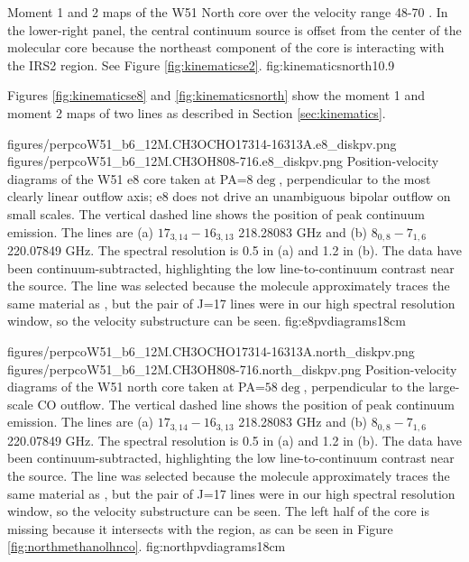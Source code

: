 \documentclass[twocolumn]{aastex61}
\begin{document}
{Moment 1 and 2 maps of the W51 North core over the velocity
range 48-70 \kms.  In the lower-right panel, the central
continuum source is offset from the center of the molecular core
because the northeast component of the core is interacting
with the IRS2 \hii region. See Figure \ref{fig:kinematicse2}.}
{fig:kinematicsnorth}{1}{0.9\textwidth}

Figures \ref{fig:kinematicse8} and \ref{fig:kinematicsnorth} show the moment 1
and moment 2 maps of two \methanol lines as described in Section
\ref{sec:kinematics}.

\FigureTwo
{figures/perpcoW51_b6_12M.CH3OCHO17314-16313A.e8_diskpv.png}
{figures/perpcoW51_b6_12M.CH3OH808-716.e8_diskpv.png}
{Position-velocity diagrams of the W51 e8 core taken at PA=$8\deg$,
perpendicular to the most clearly linear outflow axis; e8 does not drive an
unambiguous bipolar outflow on small scales.  The vertical dashed line shows the
position of peak continuum emission. The lines are (a) \methylformate
$17_{3,14}-16_{3,13}$ 218.28083 GHz and (b) \methanol $8_{0,8}-7_{1,6}$
220.07849 GHz.  The spectral resolution is 0.5 \kms in (a) and 1.2 \kms in (b).
The data have been continuum-subtracted, highlighting the low line-to-continuum
contrast near the source.  The \methylformate line was selected because the
molecule approximately traces the same material as \methanol, but the pair of
\methylformate J=17 lines were in our high spectral resolution window, so the
velocity substructure can be seen.
}
{fig:e8pvdiagrams}{1}{8cm}

\FigureTwo
{figures/perpcoW51_b6_12M.CH3OCHO17314-16313A.north_diskpv.png}
{figures/perpcoW51_b6_12M.CH3OH808-716.north_diskpv.png}
{Position-velocity diagrams of the W51 north core taken at PA=$58\deg$,
perpendicular to the large-scale CO outflow.  The vertical dashed line shows the
position of peak continuum emission. The lines are (a) \methylformate
$17_{3,14}-16_{3,13}$ 218.28083 GHz and (b) \methanol $8_{0,8}-7_{1,6}$
220.07849 GHz.  The spectral resolution is 0.5 \kms in (a) and 1.2 \kms in (b).
The data have been continuum-subtracted, highlighting the low line-to-continuum
contrast near the source.  The \methylformate line was selected because the
molecule approximately traces the same material as \methanol, but the pair of
\methylformate J=17 lines were in our high spectral resolution window, so the
velocity substructure can be seen.
The left half of the core is missing because it intersects with the \hii
region, as can be seen in Figure \ref{fig:northmethanolhnco}.
}
{fig:northpvdiagrams}{1}{8cm}
\end{document}
